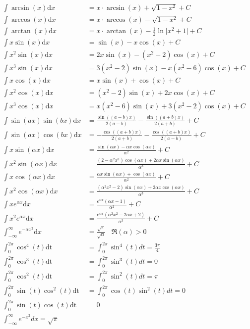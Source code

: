 \documentclass[8pt, a4paper, landscape, fleqn]{scrartcl}
\begin{document}
\begin{multicols*}{3}
\begin{align*}
						\int \arcsin(x)\text{d}x&= x\cdot \arcsin(x)+\sqrt{1-x^2}+C\\
						\int \arccos(x)\text{d}x&=x\cdot \arccos(x)-\sqrt{1-x^2}+C\\
						\int \arctan(x)\text{d}x&=x\cdot \arctan(x)-\frac{1}{2}\ln \vert x^2+1\vert+C\\
    					\int x \sin(x)\text{d}x&= \sin(x) - x \cos(x)+C \\
    					\int x^2 \sin(x) \text{d}x&= 2x\sin(x) -(x^2-2)\cos(x) + C \\
    					\int x^3 \sin(x)\text{d}x&= 3(x^2-2) \sin(x) - x(x^2-6)\cos(x) +C \\
    					\int x \cos(x) \text{d}x&= x\sin(x) +\cos(x) +C\\
    					\int x^2 \cos(x) \text{d}x&= (x^2-2)\sin(x) + 2x\cos(x) +C \\
    					\int x^3 \cos(x) \text{d}x&= x(x^2-6)\sin(x) + 3(x^2-2)\cos(x) +C \\
    					\int \sin(ax)\sin(bx)\text{d}x&= \frac{\sin((a-b)x)}{2(a-b)} - \frac{\sin((a+b)x)}{2(a+b)} +C \\
    					\int \sin(ax)\cos(bx)\text{d}x&= -\frac{\cos((a+b)x)}{2(a+b)} - \frac{\cos((a+b)x)}{2(a-b)} +C \\
    					\int x \sin(\alpha x) \text{d}x&= \frac{\sin(\alpha x) - \alpha x \cos(\alpha x)}{\alpha^2} + C \\
    					\int x^2 \sin(\alpha x) \text{d}x&= \frac{(2-\alpha^2x^2)\cos(\alpha x)+2\alpha x\sin(\alpha x)}{\alpha^3} +C \\
    					\int x \cos(\alpha x) \text{d}x&= \frac{\alpha x \sin(\alpha x)+\cos(\alpha x)}{\alpha^2} + C \\
    					\int x^2 \cos(\alpha x) \text{d}x&=\frac{(\alpha^2x^2-2)\sin(\alpha x)+2\alpha x \cos(\alpha x)}{\alpha^3} + C \\
    					\int x e^{\alpha x} \text{d}x&= \frac{e^{\alpha x}(\alpha x -1)}{\alpha ^2} +C \\
    					\int x^2 e^{\alpha x} \text{d}x&= \frac{e^{\alpha x}(\alpha ^2 x^2 -2\alpha x +2)}{\alpha ^3} +C \\
    					\int_{-\infty}^\infty e^{-\alpha x^2} \text{d}x&= \frac{\sqrt{\pi}}{\sqrt{\alpha}}\hspace{10pt}\Re(\alpha) > 0 \\
    					\int_0^{2\pi}\cos^4(t)\text{dt}&=\int_0^{2\pi}\sin^4(t)dt=\frac{3\pi}{4}\\
    					\int_0^{2\pi}\cos^3(t)\text{dt}&=\int_0^{2\pi}\sin^3(t)dt=0\\
    					\int_0^{2\pi}\cos^2(t)\text{dt}&=\int_0^{2\pi}\sin^2(t)dt=\pi\\
    					\int_0^{2\pi}\sin(t)\cos^2(t)\text{dt}&=\int_0^{2\pi}\cos(t)\sin^2(t)dt=0\\
    					\int_0^{2\pi}\sin(t)\cos(t)\text{dt}&=0\\
					    \int_{-\infty}^{\infty}{e^{-x^2}}dx=\sqrt{\pi}
					\end{align*}

\end{multicols*}
\end{document}
